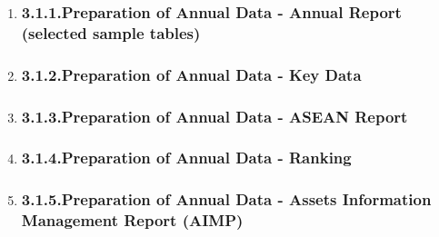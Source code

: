 \documentclass{article}
\begin{document}
\begin{enumerate}%

\item{}
\subsubsection{3.1.1.\hspace*{0.5em}Preparation of Annual Data - Annual Report (selected sample tables)}\label{sec-preparation-of-annual-data---annual-report-selected-sample-tables}%

\item{}
\subsubsection{3.1.2.\hspace*{0.5em}Preparation of Annual Data - Key Data}\label{sec-preparation-of-annual-data---key-data}%

\item{}
\subsubsection{3.1.3.\hspace*{0.5em}Preparation of Annual Data - ASEAN Report}\label{sec-preparation-of-annual-data---asean-report}%

\item{}
\subsubsection{3.1.4.\hspace*{0.5em}Preparation of Annual Data - Ranking}\label{sec-preparation-of-annual-data---ranking}%

\item{}
\subsubsection{3.1.5.\hspace*{0.5em}Preparation of Annual Data - Assets Information Management Report (AIMP)}\label{sec-preparation-of-annual-data---assets-information-management-report-aimp}%


\end{enumerate}
\end{document}
